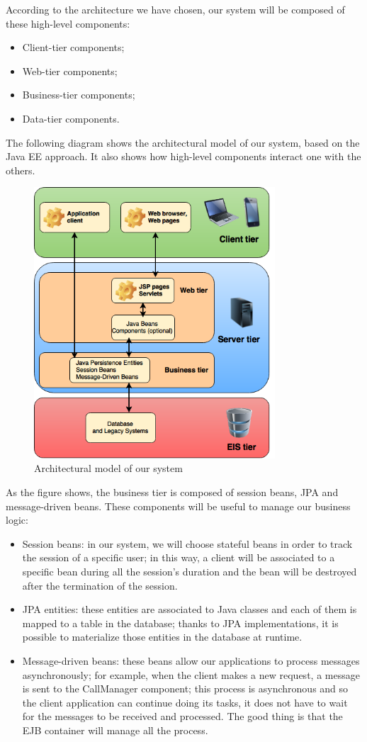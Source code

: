 According to the architecture we have chosen, our system will be composed of these high-level components:
\begin{itemize}
    \item Client-tier components;
    \item Web-tier components;
    \item Business-tier components;
    \item Data-tier components.
\end{itemize}

The following diagram shows the architectural model of our system, based on the Java EE approach. It also shows how high-level components interact one with the others.

    \begin{figure}[H]
        \centering
        \includegraphics[width=9cm]{./Images/ArchitecturalModel.png}
        \caption{Architectural model of our system}
    \end{figure}

As the figure shows, the business tier is composed of session beans, JPA and message-driven beans. These components will be useful to manage our business logic:
    \begin{itemize}
        \item Session beans: in our system, we will choose stateful beans in order to track the session of a specific user; in this way, a client will be associated to a specific bean during all the session's duration and the bean will be destroyed after the termination of the session.
        \item JPA entities: these entities are associated to Java classes and each of them is mapped to a table in the database; thanks to JPA implementations, it is possible to materialize those entities in the database at runtime.
        \item Message-driven beans: these beans allow our applications to process messages asynchronously; for example, when the client makes a new request, a message is sent to the CallManager component; this process is asynchronous and so the client application can continue doing its tasks, it does not have to wait for the messages to be received and processed. The good thing is that the EJB container will manage all the process. 
    \end{itemize}

